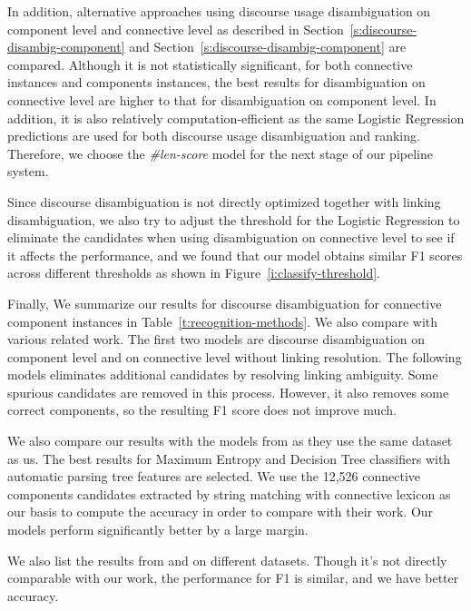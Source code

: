 In addition, alternative approaches using discourse usage
disambiguation on component level and connective
level as described in Section~\ref{s:discourse-disambig-component} and
Section~\ref{s:discourse-disambig-component} are compared.
Although it is not statistically significant, for both connective
instances and components instances, the best results for disambiguation on connective
level are higher to that for disambiguation on component level.
In addition, it is also relatively computation-efficient as the same Logistic
Regression predictions are used for both discourse usage disambiguation and ranking.
Therefore, we choose the \textit{\#len-score} model for the next stage of our
pipeline system.



Since discourse disambiguation is not directly optimized together with linking
disambiguation, we also try to adjust the threshold for the Logistic Regression
to eliminate the candidates when using disambiguation on connective level to see if
it affects the performance, and we found that our model
obtains similar F1 scores across different thresholds as
shown in Figure~\ref{i:classify-threshold}.



Finally, We summarize our results for discourse disambiguation for
connective component instances in Table~\ref{t:recognition-methods}. We also
compare with various related work. The first two models are discourse disambiguation
on component level and on connective level without linking resolution. The following
models eliminates additional candidates by resolving linking ambiguity.
Some spurious candidates are removed in this process. However, it also removes some
correct components, so the resulting F1 score does not improve much.



We also compare our results with the models from \cite{li2015automatic} as they use the
same dataset as us. The best results for Maximum Entropy and Decision Tree classifiers with
automatic parsing tree features are selected. We use the 12,526 connective components candidates
extracted by string matching with connective lexicon as our basis to compute the accuracy in order
to compare with their work. Our models perform significantly better by a large margin.

We also list the results from \cite{zhou2012cross} and \cite{li2014cross} on different
datasets. Though it's not directly comparable with our work, the performance for F1 is similar,
and we have better accuracy.


